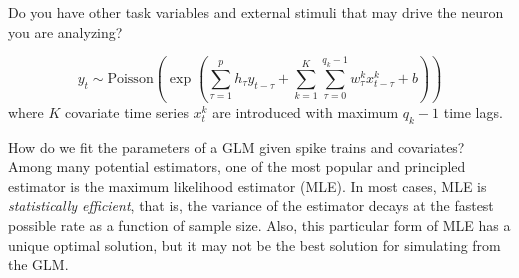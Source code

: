\documentclass[a4paper,11pt]{exam}
\newcounter{homework}
\newcommand{\homework}{\stepcounter{homework}\textcolor{violet}{\textbf{Homework \thehomework:}~}}
\newcommand{\funfact}{\textbf{Fun Fact:}~}
\begin{document}
\begin{questions}

\newpage
Do you have other task variables and external stimuli that may drive the neuron you are analyzing\cite{Park2014d}?
\begin{tcolorbox}[colback=red!5!white,colframe=red!50!black,title=GLM with covariates]
\begin{equation}\label{eq:GLM2}
    y_t \sim \text{Poisson}\left(\exp\left( \sum_{\tau=1}^p h_\tau y_{t-\tau} + \sum_{k=1}^K \sum_{\tau=0}^{q_k-1} w^k_\tau x^k_{t-\tau} + b\right)\right)
\end{equation}
where $K$ covariate time series $x^k_t$ are introduced with maximum $q_k-1$ time lags.
\end{tcolorbox}
How do we fit the parameters of a GLM given spike trains and covariates?
Among many potential estimators, one of the most popular and principled estimator is the maximum likelihood estimator (MLE).
In most cases, MLE is \emph{statistically efficient}, that is, the variance of the estimator decays at the fastest possible rate as a function of sample size.
Also, this particular form of MLE has a unique optimal solution, but it may not be the best solution for simulating from the GLM\cite{Arribas2020a}.


\end{questions}
\end{document}
